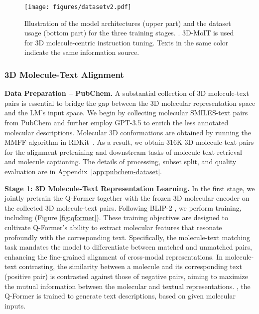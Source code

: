 \begin{figure}[t]
\centering
\texttt{[image: figures/datasetv2.pdf]}
\vspace{-4pt}
\caption{Illustration of the model architectures (upper part) and the dataset usage (bottom part) for the three training stages. . 3D-MoIT is used for 3D molecule-centric instruction tuning. Texts in the same color indicate the same information source.
}
\label{fig:dataset}
\vspace{-13pt}
\end{figure}

\subsubsection{3D Molecule-Text Alignment}\label{sec:alignment}
\textbf{Data Preparation -- PubChem.}
A substantial collection of 3D molecule-text pairs is essential to bridge the gap between the 3D molecular representation space and the LM's input space. 
We begin by collecting molecular SMILES-text pairs from PubChem and further employ GPT-3.5 to enrich the less annotated molecular descriptions. Molecular 3D conformations are obtained by running the MMFF algorithm in RDKit~\citep{rdkit}. 
As a result, we obtain 316K 3D molecule-text pairs for the alignment pretraining and downstream tasks of molecule-text retrieval and molecule captioning.
The details of processing, subset split, and quality evaluation are in Appendix~\ref{app:pubchem-dataset}.

\textbf{Stage 1: 3D Molecule-Text Representation Learning.} 
In the first stage, we jointly pretrain the Q-Former together with the frozen 3D molecular encoder on the collected 3D molecule-text pairs. Following BLIP-2 \citep{blip2}, we perform  training, including  (\cf Figure \ref{fig:qformer}).
These training objectives are designed to cultivate Q-Former's ability to extract molecular features that resonate profoundly with the corresponding text. Specifically, the molecule-text matching task mandates the model to differentiate between matched and unmatched pairs, enhancing the fine-grained alignment of cross-modal representations.
In molecule-text contrasting, the similarity between a molecule and its corresponding text (\ie positive pair) is contrasted against those of negative pairs, aiming to maximize the mutual information between the molecular and textual representations.
, the Q-Former is trained to generate text descriptions, based on given molecular inputs.

